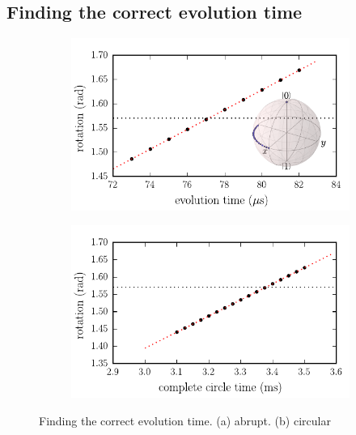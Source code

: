 \subsection{Finding the correct evolution time}

\begin{figure}[H]
	\centering
	\begin{subfigure}[t]{0.49\textwidth}
		\centering
		\includegraphics[width=\linewidth]{abrupt_find_tau/abrupt_find_tau_full.pdf}
		\caption{}
		\label{fig:abrupt_tau}
	\end{subfigure}
	\begin{subfigure}[t]{0.49\textwidth}
		\centering
		\includegraphics[width=\linewidth]{circular_find_tau/circle_find_tau.pdf}
		\caption{}
		\label{fig:circ_tau}
	\end{subfigure}
	\label{fig:find_tau}
	\caption{Finding the correct evolution time. (a) abrupt. (b) circular}
\end{figure}


